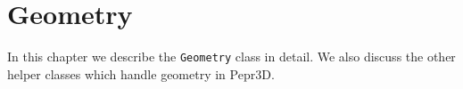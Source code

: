 \chapter{Geometry}

In this chapter we describe the \texttt{Geometry} class in detail. We also discuss the other helper classes which handle geometry in Pepr3D.

\label{chap:geom}

\label{sec:fonts}